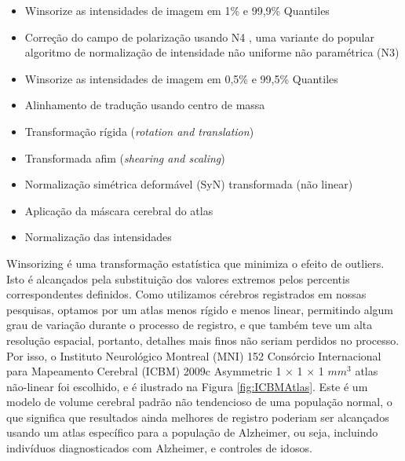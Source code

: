 \documentclass[openright]{UFRGS} %
\begin{document}
\begin{itemize}
\item Winsorize as intensidades de imagem em 1\% e 99,9\% Quantiles
\item Correção do campo de polarização usando N4 , uma variante do popular algoritmo de normalização de intensidade não uniforme não paramétrica (N3)

\item Winsorize as intensidades de imagem em 0,5\% e 99,5\% Quantiles
\item Alinhamento de tradução usando centro de massa
\item Transformação rígida (\textit{rotation and translation})
\item Transformada afim (\textit{shearing and scaling})
\item Normalização simétrica deformável (SyN) transformada (não linear)
\item Aplicação da máscara cerebral do atlas
\item  Normalização das intensidades 

\end{itemize}

Winsorizing é uma transformação estatística que minimiza o efeito de outliers. Isto é
alcançados pela substituição dos valores extremos pelos percentis correspondentes definidos. Como
utilizamos cérebros registrados em nossas pesquisas, optamos por um atlas menos rígido e menos linear,
permitindo algum grau de variação durante o processo de registro, e que também teve um
alta resolução espacial, portanto, detalhes mais finos não seriam perdidos no processo. Por isso, o
Instituto Neurológico Montreal (MNI) 152 Consórcio Internacional para Mapeamento Cerebral
(ICBM) 2009c Asymmetric 1 × 1 × 1 $mm^3$ atlas não-linear foi escolhido, e é
ilustrado na Figura \ref{fig:ICBMAtlas}. Este é um modelo de volume cerebral padrão não tendencioso de
uma população normal, o que significa que resultados ainda melhores de registro poderiam ser alcançados 
usando um atlas específico para a população de Alzheimer, ou seja, incluindo indivíduos diagnosticados com Alzheimer, e controles de idosos. 
\end{document}
